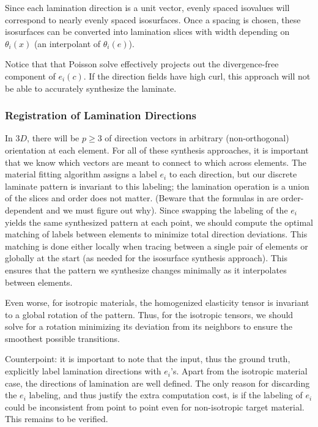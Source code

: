 \documentclass[10pt]{article}
\begin{document}
Since each lamination direction is a unit vector, evenly
spaced isovalues will correspond to nearly evenly spaced isosurfaces.
Once a spacing is chosen, these isosurfaces can be converted into lamination
slices with width depending on $\theta_i(x)$ (an interpolant of $\theta_i(e)$).

Notice that that Poisson solve effectively projects out the divergence-free
component of $e_i(c)$. If the direction fields have high curl, this approach
will not be able to accurately synthesize the laminate.

\subsubsection{Registration of Lamination Directions}
\label{sec:registration}
In $3D$, there will be $p \ge 3$ of direction vectors in arbitrary
(non-orthogonal) orientation at each element. For all of these synthesis
approaches, it is important that we know which vectors are meant to connect to
which across elements. The material fitting algorithm assigns a label $e_i$ to
each direction, but our discrete laminate pattern is invariant to this labeling;
the lamination operation is a union of the slices and order does not matter.
(Beware that the formulas in \cite{allaire2002shape} are order-dependent and we
must figure out why). Since swapping the labeling of the $e_i$ yields the same
synthesized pattern at each point, we should compute the optimal matching of
labels between elements to minimize total direction deviations. This matching is
done either locally when tracing between a single pair of elements or globally
at the start (as needed for the isosurface synthesis approach). This ensures
that the pattern we synthesize changes minimally as it interpolates between
elements.

Even worse, for isotropic materials, the homogenized elasticity tensor is
invariant to a global rotation of the pattern. Thus, for the isotropic tensors,
we should solve for a rotation minimizing its deviation from its neighbors to
ensure the smoothest possible transitions.

Counterpoint: it is important to note that the input, thus the ground truth,
explicitly label lamination directions with $e_i$'s.  Apart from the isotropic
material case, the directions of lamination are well defined.  The only reason
for discarding the $e_i$ labeling, and thus justify the extra computation cost,
is if the labeling of $e_i$ could be inconsistent from point to point even for
non-isotropic target material.  This remains to be verified.
\end{document}
